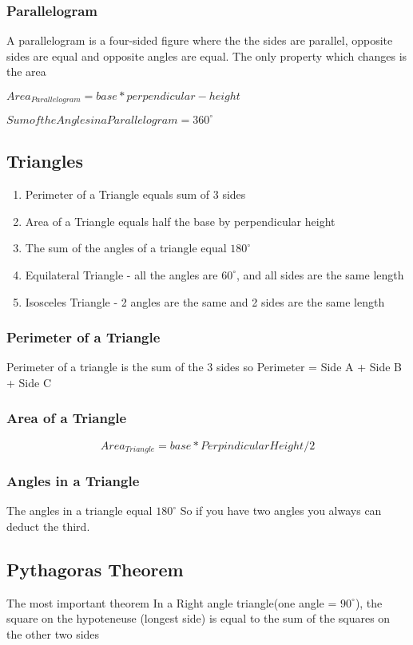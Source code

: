 \documentclass{article}
\begin{document}
\subsubsection{Parallelogram}
A parallelogram is a four-sided figure where the the sides are parallel, opposite sides are equal and opposite angles are equal.
The only property which changes is the area

$Area_{Parallelogram} = base * perpendicular-height$

$Sum of the Angles in a Parallelogram  = 360^{\circ}$


\newpage
\subsection{Triangles}
\begin{enumerate}
\item Perimeter of a Triangle equals sum of 3 sides
\item Area of a Triangle equals half the base by perpendicular height
\item The sum of the angles of a triangle equal $180^{\circ}$
\item Equilateral Triangle - all the angles are $60^{\circ}$, and all sides are the same length
\item Isosceles Triangle - 2 angles are the same and 2 sides are the same length
\end{enumerate}
\subsubsection{Perimeter of a Triangle}
Perimeter of a triangle is the sum of the 3 sides so
Perimeter = Side A + Side B + Side C
\subsubsection{Area of a Triangle}
\begin{equation}
Area_{Triangle} = base * Perpindicular Height / 2
\end{equation}
\subsubsection{Angles in a Triangle}
The angles in a triangle equal $180^{\circ}$
So if you have two angles you always can deduct the third.
\newpage
\subsection{Pythagoras Theorem}
The most important theorem In a Right angle triangle(one angle = $90^{\circ}$), the square on the hypoteneuse (longest side) is equal to the sum of the squares on the other two sides
\end{document}
